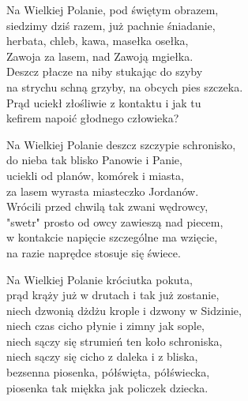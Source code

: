 \begin{text}
    Na Wielkiej Polanie, pod świętym obrazem,\\
    siedzimy dziś razem, już pachnie śniadanie,\\
    herbata, chleb, kawa, masełka osełka,\\
    Zawoja za lasem, nad Zawoją mgiełka.\\
    Deszcz płacze na niby stukając do szyby\\
    na strychu schną grzyby, na obcych pies szczeka.\\
    Prąd uciekł złośliwie z kontaktu i jak tu\\
    kefirem napoić głodnego człowieka?

    Na Wielkiej Polanie deszcz szczypie schronisko,\\
    do nieba tak blisko Panowie i Panie,\\
    uciekli od planów, komórek i miasta,\\
    za lasem wyrasta miasteczko Jordanów.\\
    Wrócili przed chwilą tak zwani wędrowcy,\\
    "swetr" prosto od owcy zawieszą nad piecem,\\
    w kontakcie napięcie szczególne ma wzięcie,\\
    na razie naprędce stosuje się świece.

    Na Wielkiej Polanie króciutka pokuta,\\
    prąd krąży już w drutach i tak już zostanie,\\
    niech dzwonią dżdżu krople i dzwony w Sidzinie,\\
    niech czas cicho płynie i zimny jak sople,\\
    niech sączy się strumień ten koło schroniska,\\
    niech sączy się cicho z daleka i z bliska,\\
    bezsenna piosenka, półświęta, półświecka,\\
    piosenka tak miękka jak policzek dziecka.
\end{text}
\begin{chord}

\end{chord}